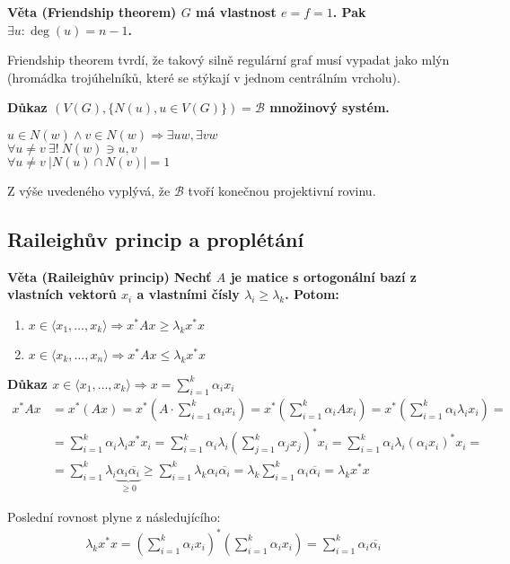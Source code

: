 \documentclass[a4paper,12pt,titlepage]{article}
\newcommand{\dk}{\smallskip\noindent\bf Důkaz\rm{} }
\newcommand{\vt}{\smallskip\noindent\bf Věta\rm{} }
\newcommand{\B}{\mathcal{B}}
\newcommand{\sk}[1]{{\langle #1\rangle}}
\begin{document}
\vt (Friendship theorem) $G$ má vlastnost $e = f = 1$. Pak $\exists u: \deg(u) = n-1$.

Friendship theorem tvrdí, že takový silně regulární graf musí vypadat jako
mlýn (hromádka trojúhelníků, které se stýkají v jednom centrálním vrcholu).

\dk $(V(G), \{N(u), u\in V(G)\}) = \B$ množinový systém.

$u \in N(w) \wedge v \in N(w) \Rightarrow \exists uw, \exists vw$ \\
\indent $\forall u\neq v\ \exists!\ N(w) \ni u,v$ \\
\indent $\forall u\neq v\ |N(u)\cap N(v)| = 1$

Z výše uvedeného vyplývá, že $\B$ tvoří konečnou projektivní rovinu.

\subsection{Raileighův princip a proplétání}
\vt (Raileighův princip) Nechť $A$ je matice s ortogonální bazí z vlastních 
vektorů $x_i$ a vlastními čísly $\lambda_i \geq \lambda_k$. Potom:
\begin{enumerate}
\item $x \in\sk{x_1,\dots,x_k} \Rightarrow x^*Ax\ge \lambda_kx^*x$
\item $x \in\sk{x_k,\dots,x_n} \Rightarrow x^*Ax\le \lambda_kx^*x$
\end{enumerate}

\dk $x \in\sk{x_1,\dots,x_k} \Rightarrow x = \sum_{i=1}^k \alpha_ix_i$
\begin{align*}
	x^*Ax &= x^*(Ax) = x^*\left(A\cdot\sum_{i=1}^k\alpha_ix_i\right) = x^*\left(\sum_{i=1}^k\alpha_iAx_i\right) = x^*\left(\sum_{i=1}^k\alpha_i\lambda_ix_i\right) = \\
	&= \sum_{i=1}^k\alpha_i\lambda_ix^*x_i = \sum_{i=1}^k\alpha_i\lambda_i\left(\sum_{j=1}^k \alpha_jx_j\right)^*x_i = \sum_{i=1}^k \alpha_i\lambda_i(\alpha_ix_i)^*x_i = \\
	&= \sum_{i=1}^k \lambda_i\underbrace{\alpha_i\overline{\alpha_i}}_{\ge 0} \ge \sum_{i=1}^k \lambda_k\alpha_i\overline{\alpha_i} = \lambda_k\sum_{i=1}^k \alpha_i\overline{\alpha_i} = \lambda_kx^*x
\end{align*}

Poslední rovnost plyne z následujícího:
\begin{align*}
	 \lambda_kx^*x = \left(\sum_{i=1}^k \alpha_ix_i\right)^*\left(\sum_{i=1}^k \alpha_ix_i\right) = \sum_{i=1}^k \alpha_i\overline{\alpha_i}
\end{align*}
\end{document}
